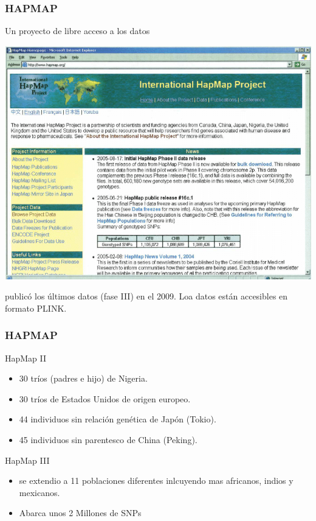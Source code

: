 \documentclass{beamer}\usepackage[]{graphicx}\usepackage[]{color}
\begin{document}
\begin{frame}[fragile]
\frametitle{HAPMAP}
Un proyecto de libre acceso a los datos

\begin{center}
\includegraphics[width=0.7\linewidth]{hapmap.png}
\end{center}

public\'o los \'ultimos datos (fase III) en el 2009.
Loa datos est\'an accesibles en formato PLINK.
\end{frame}




\begin{frame}[fragile]
\frametitle{HAPMAP}
HapMap II
\begin{itemize}
\item     30 tr\'ios (padres e hijo) de Nigeria.
\item     30 tr\'ios de Estados Unidos de origen europeo. 
\item     44 individuos sin relaci\'on gen\'etica de Jap\'on (Tokio).
\item     45 individuos sin parentesco de China (Peking).
\end{itemize}

HapMap III 
\begin{itemize}
\item se extendio a 11 poblaciones diferentes inlcuyendo mas africanos, indios y mexicanos.
\item Abarca unos 2 Millones de SNPs
\end{itemize}

\end{frame}
\end{document}
